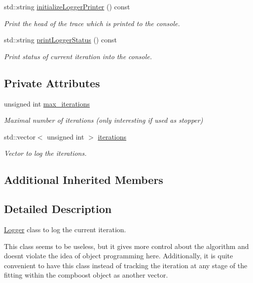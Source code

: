 \begin{DoxyCompactItemize}
std\+::string \mbox{\hyperlink{classlogger_1_1_iteration_logger_ac4ba1eb6419eef2a3c21e9a4323aec1c}{initialize\+Logger\+Printer}} () const
\begin{DoxyCompactList}\small\item\em Print the head of the trace which is printed to the console. \end{DoxyCompactList}\item 
std\+::string \mbox{\hyperlink{classlogger_1_1_iteration_logger_ac3c13bef35391c0408eb196d01b2a286}{print\+Logger\+Status}} () const
\begin{DoxyCompactList}\small\item\em Print status of current iteration into the console. \end{DoxyCompactList}\end{DoxyCompactItemize}
\subsection*{Private Attributes}
\begin{DoxyCompactItemize}
\item 
unsigned int \mbox{\hyperlink{classlogger_1_1_iteration_logger_a3fe389ce81d0790729b59b96414a3909}{max\+\_\+iterations}}
\begin{DoxyCompactList}\small\item\em Maximal number of iterations (only interesting if used as stopper) \end{DoxyCompactList}\item 
std\+::vector$<$ unsigned int $>$ \mbox{\hyperlink{classlogger_1_1_iteration_logger_a7c9d7b0bd792a93a6dd5d9601a10a9b4}{iterations}}
\begin{DoxyCompactList}\small\item\em Vector to log the iterations. \end{DoxyCompactList}\end{DoxyCompactItemize}
\subsection*{Additional Inherited Members}


\subsection{Detailed Description}
\mbox{\hyperlink{classlogger_1_1_logger}{Logger}} class to log the current iteration. 

This class seems to be useless, but it gives more control about the algorithm and doesn\textquotesingle{}t violate the idea of object programming here. Additionally, it is quite convenient to have this class instead of tracking the iteration at any stage of the fitting within the compboost object as another vector. 


